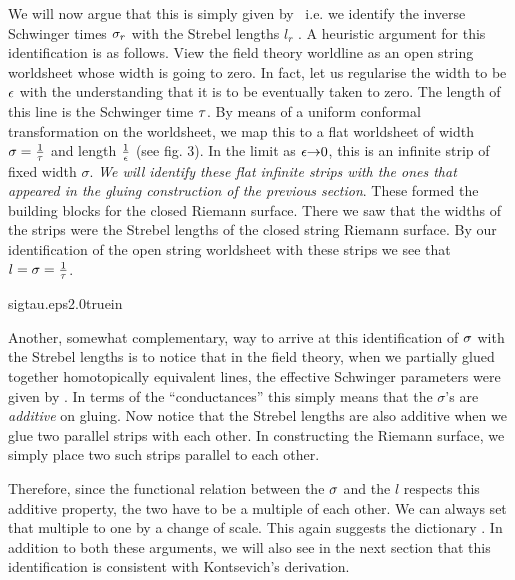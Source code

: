 We will now argue that this is simply given by \dic\ i.e. we identify 
the inverse Schwinger times ${\sigma}_r$ with the Strebel lengths $l_r$ 
. 
A heuristic argument for this identification is as follows.
View the field theory worldline as an open string worldsheet 
whose width is going to zero. In fact, let us regularise the width to be 
${\epsilon}$ with the understanding that it is to be eventually taken 
to zero. The length of this line is the Schwinger time ${\tau}$. 
By means of a uniform conformal transformation on the worldsheet, we 
map this to a flat worldsheet of width ${\sigma}={1\over {\tau}}$ and length
${1\over {\epsilon}}$ (see fig. 3). 
In the limit as ${\epsilon} {\rightarrow} 0$, this is an infinite 
strip of fixed width $\sigma$. 
{\it We will identify these flat infinite strips
with the ones that appeared in the gluing construction of the
previous section}. These formed the building blocks for the 
closed Riemann surface. There we saw that the widths
of the strips were 
the Strebel lengths of the closed string Riemann surface.
By our identification of the open string worldsheet with these strips
we see that $l={\sigma}={1\over {\tau}}$. 

%
{sigtau.eps}{2.0truein}
%

Another, somewhat complementary, 
way to arrive at this identification of ${\sigma}$ with the 
Strebel lengths is to notice that in the field theory, when we 
partially glued together homotopically equivalent lines, the effective 
Schwinger parameters were given by \resist . In terms of 
the ``conductances'' this simply means that the $\sigma$'s are 
{\it additive} on gluing. Now notice 
that the Strebel lengths are also additive when  
we glue two parallel strips with each other. In constructing the 
Riemann surface, we simply place two such strips parallel to each other. 

Therefore, since the 
functional relation between the ${\sigma}$ and the $l$ respects this additive 
property, the two have to be a multiple of each other. We can always 
set that multiple to one by a change of scale. This again suggests 
the dictionary \dic . In addition to both these arguments, we will also 
see in the next section
that this identification is consistent with Kontsevich's  derivation.

